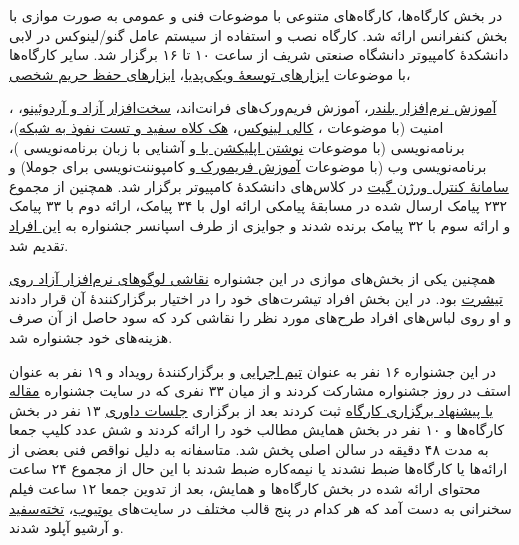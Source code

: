 \documentclass{article}
\begin{document}
{در بخش کارگاه‌ها، کارگاه‌های متنوعی با موضوعات فنی و عمومی به صورت موازی با بخش کنفرانس ارائه شد. کارگاه نصب و استفاده از سیستم عامل گنو/لینوکس در لابی دانشکدهٔ کامپیوتر دانشگاه صنعتی شریف از ساعت ۱۰ تا ۱۶ برگزار شد. سایر کارگاه‌ها با موضوعات \href{https://www.youtube.com/watch?v=U_r1nsnIu5c&index=12&list=PLzkZTZKm4j8GhgZ_O4k7uzJFcA0Ai5FIL}{ابزارهای توسعهٔ ویکی‌پدیا}، \href{https://www.youtube.com/watch?v=ORnXkMFw2v4&list=PLzkZTZKm4j8GhgZ_O4k7uzJFcA0Ai5FIL&index=13}{ابزارهای حفظ حریم شخصی}، {\href{https://www.youtube.com/watch?v=BZaZr5K5f64&list=PLzkZTZKm4j8GhgZ_O4k7uzJFcA0Ai5FIL&index=14}{آموزش نرم‌افزار بلندر}، آموزش فریم‌ورک‌های فرانت‌اند، {\href{https://www.youtube.com/watch?v=Qp6fcUIAe-A&list=PLzkZTZKm4j8GhgZ_O4k7uzJFcA0Ai5FIL&index=15}{سخت‌افزار آزاد و آردوئینو}، ، امنیت (با موضوعات ، \href{https://www.youtube.com/watch?v=22ijjCLk2dw&list=PLzkZTZKm4j8GhgZ_O4k7uzJFcA0Ai5FIL&index=18}{کالی لینوکس}، \href{https://www.youtube.com/watch?v=XFumj-_CTGQ&list=PLzkZTZKm4j8GhgZ_O4k7uzJFcA0Ai5FIL&index=19}{هک کلاه سفید و تست نفوذ به شبکه})، برنامه‌نویسی (با موضوعات \href{http://sfd.fsug.ir/1394/workshops/73-qt}{نوشتن اپلیکشن با } و آشنایی با زبان برنامه‌نویسی )، برنامه‌نویسی وب (با موضوعات \href{http://sfd.fsug.ir/1394/workshops/72-yii2}{آموزش فریمورک }} و کامپوننت‌نویسی برای جوملا) و \href{https://www.youtube.com/watch?v=BvU-Z7oXvmg&list=PLzkZTZKm4j8GhgZ_O4k7uzJFcA0Ai5FIL&index=20}{سامانهٔ کنترل ورژن گیت} در کلاس‌های دانشکدهٔ کامپیوتر برگزار شد. همچنین از مجموع ۲۳۲ پیامک ارسال شده در مسابقهٔ پیامکی ارائه اول با ۳۴ پیامک، ارائه دوم با ۳۳ پیامک و ارائه سوم با ۳۲ پیامک برنده شدند و جوایزی از طرف اسپانسر جشنواره به  \href{https://twitter.com/tehsfd/status/725078247520788482}{این افراد} تقدیم شد.

همچنین یکی از بخش‌های موازی در این جشنواره \href{http://sfd.fsug.ir/1394/paint}{نقاشی لوگوهای نرم‌افزار آزاد روی تیشرت} بود. در این بخش افراد تیشرت‌های خود را در اختیار برگزارکنندهٔ آن قرار دادند و او روی لباس‌های افراد طرح‌های مورد نظر را نقاشی کرد که سود حاصل از آن صرف هزینه‌های خود جشنواره شد.

در این جشنواره ۱۶ نفر به عنوان \href{http://sfd.fsug.ir/1394/patronage/staff}{تیم اجرایی} و برگزارکنندهٔ رویداد و ۱۹ نفر به عنوان استف در روز جشنواره مشارکت کردند و از میان ۳۳ نفری که در سایت جشنواره \href{http://sfd.fsug.ir/1394/plan/articles}{مقاله یا پیشنهاد برگزاری کارگاه} ثبت کردند بعد از برگزاری \href{http://sfd.fsug.ir/1394/referee}{جلسات داوری} ۱۳ نفر در بخش کارگاه‌ها و ۱۰ نفر در بخش همایش مطالب خود را ارائه کردند و شش عدد کلیپ جمعا به مدت ۴۸ دقیقه در سالن اصلی پخش شد. متاسفانه به دلیل نواقص فنی بعضی از ارائه‌ها یا کارگاه‌ها ضبط نشدند یا نیمه‌کاره ضبط شدند با این حال از مجموع ۲۴ ساعت محتوای ارائه شده در بخش کارگاه‌ها و همایش، بعد از تدوین جمعا ۱۲ ساعت فیلم سخنرانی به دست آمد که هر کدام در پنج قالب مختلف در سایت‌های \href{https://www.youtube.com/channel/UCbhw92WI8GJZDdBMXn4ONXA?sub_confirmation=1}{یوتیوب}، \href{http://takhtesefid.org/user/freeknowledgefoundation}{تخته‌سفید} و آرشیو آپلود شدند.

}}
\end{document}
